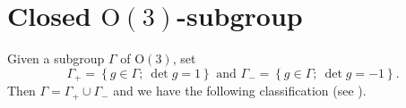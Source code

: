 \documentclass[11pt,a4paper]{amsart}
\theoremstyle{definition}
\newcommand{\OO}{\mathrm{O}}                %
\newcommand{\1}{\mathds{1}}		            %
\newcommand{\set}[1]{\left\{#1\right\}}     %
\begin{document}
\appendix

\section{Closed $\OO(3)$-subgroup}
\label{sec:O3-subgroups}

Given a subgroup $\Gamma$ of $\OO(3)$, set
\begin{equation*}
  \Gamma_+=\set{g\in \Gamma;\ \det g=1} \text{ and } \Gamma_-=\set{g\in \Gamma;\ \det g=-1}.
\end{equation*}
Then $\Gamma=\Gamma_+ \cup \Gamma_-$ and we have the following classification (see \cite{GSS1988}).
\end{document}
